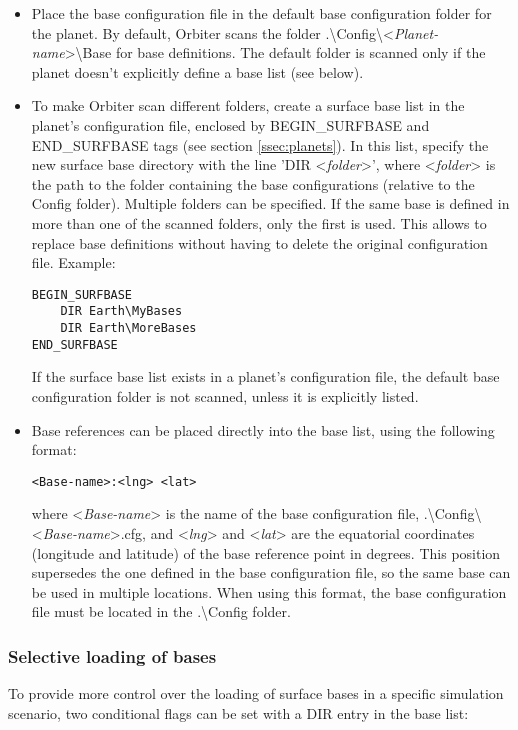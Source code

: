 \documentclass[Orbiter Developer Manual.tex]{subfiles}
\begin{document}
\begin{itemize}
\item Place the base configuration file in the default base configuration folder for the planet. By default, Orbiter scans the folder .\textbackslash Config\textbackslash <\textit{Planet-name}>\textbackslash Base for base definitions. The default folder is scanned only if the planet doesn't explicitly define a base list (see below).
\item To make Orbiter scan different folders, create a surface base list in the planet's configuration file, enclosed by BEGIN\_SURFBASE and END\_SURFBASE tags (see section \ref{ssec:planets}). In this list, specify the new surface base directory with the line 'DIR <\textit{folder}>', where <\textit{folder}> is the path to the folder containing the base configurations (relative to the Config folder). Multiple folders can be specified. If the same base is defined in more than one of the scanned folders, only the first is used. This allows to replace base definitions without having to delete the original configuration file. Example:

\begin{lstlisting}[language=OSFS]
BEGIN_SURFBASE
	DIR Earth\MyBases
	DIR Earth\MoreBases
END_SURFBASE
\end{lstlisting}

\noindent
If the surface base list exists in a planet's configuration file, the default base configuration folder is not scanned, unless it is explicitly listed.
\item Base references can be placed directly into the base list, using the following format:\\

\begin{lstlisting}[language=OSFS]
<Base-name>:<lng> <lat>
\end{lstlisting}

\noindent
where <\textit{Base-name}> is the name of the base configuration file, .\textbackslash Config\textbackslash <\textit{Base-name}>.cfg, and <\textit{lng}> and <\textit{lat}> are the equatorial coordinates (longitude and latitude) of the base reference point in degrees. This position supersedes the one defined in the base configuration file, so the same base can be used in multiple locations. When using this format, the base configuration file must be located in the .\textbackslash Config folder.
\end{itemize}


\subsubsection*{Selective loading of bases}
To provide more control over the loading of surface bases in a specific simulation scenario, two conditional flags can be set with a DIR entry in the base list:
\end{document}
